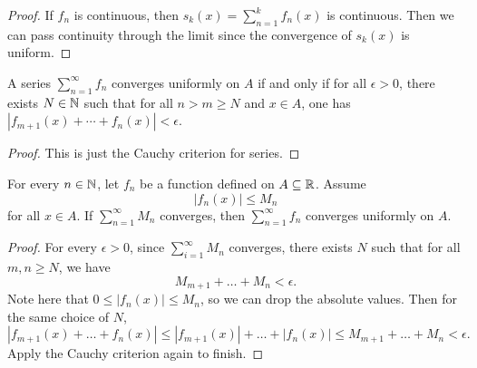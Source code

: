 \begin{proof}
  If $f_n$ is continuous, then
  $s_k(x) = \sum_{n = 1}^k f_n(x)$ is continuous.
  Then we can pass continuity through the limit since
  the convergence of $s_k(x)$ is uniform.
\end{proof}

\begin{theorem}
  A series $\sum_{n = 1}^\infty f_n$ converges uniformly
  on $A$ if and only if for all $\epsilon > 0$, there
  exists $N \in \mathbb{N}$ such that for all $n > m \ge N$ and
  $x \in A$, one has
  $|f_{m + 1}(x) + \cdots + f_n(x)| < \epsilon$.
\end{theorem}

\begin{proof}
  This is just the Cauchy criterion for series.
\end{proof}

\begin{corollary}
  For every $n \in \mathbb{N}$, let $f_n$ be a function
  defined on $A \subseteq \mathbb{R}$. Assume
  \[|f_n(x)| \le M_n\]
  for all $x \in A$. If $\sum_{n = 1}^\infty M_n$
  converges, then $\sum_{n = 1}^\infty f_n$ converges
  uniformly on $A$.
\end{corollary}

\begin{proof}
  For every $\epsilon > 0$, since $\sum_{i = 1}^\infty M_n$
  converges,
  there exists $N$ such that
  for all $m, n \ge N$, we have
  \[M_{m + 1} + \dots + M_n < \epsilon.\]
  Note here that $0 \le |f_n(x)| \le M_n$, so we can
  drop the absolute values. Then for the same choice
  of $N$,
  \[
    |f_{m + 1}(x) + \dots + f_n(x)|
    \le |f_{m + 1}(x)| + \dots + |f_n(x)|
    \le M_{m + 1} + \dots + M_n < \epsilon.
  \]
  Apply the Cauchy criterion again to finish.
\end{proof}
